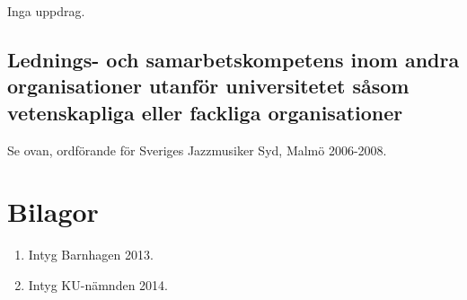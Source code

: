 Inga uppdrag.

\subsection*{\textsf{Lednings- och samarbetskompetens inom andra organisationer utanför universitetet såsom vetenskapliga eller fackliga organisationer}}

Se ovan, ordförande för Sveriges Jazzmusiker Syd, Malmö 2006-2008.

\section*{\textsf{Bilagor}}

\begin{enumerate}
\item Intyg Barnhagen 2013.
\item Intyg KU-nämnden 2014.
\end{enumerate}
